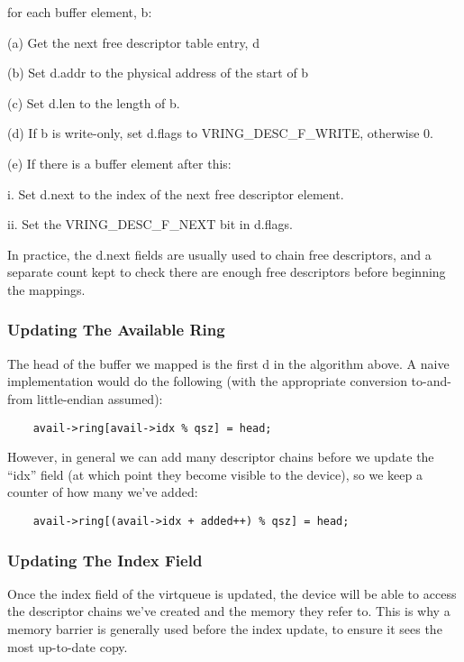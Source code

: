 for each buffer element, b:

  (a) Get the next free descriptor table entry, d

  (b) Set d.addr to the physical address of the start of b

  (c) Set d.len to the length of b.

  (d) If b is write-only, set d.flags to VRING_DESC_F_WRITE,
    otherwise 0.

  (e) If there is a buffer element after this:

    i. Set d.next to the index of the next free descriptor
      element.

    ii. Set the VRING_DESC_F_NEXT bit in d.flags.

In practice, the d.next fields are usually used to chain free
descriptors, and a separate count kept to check there are enough
free descriptors before beginning the mappings.

\subsubsection{Updating The Available Ring}\label{sec:General Initialization And Device Operation / Device Operation / Supplying Buffers to The Device / Updating The Available Ring}

The head of the buffer we mapped is the first d in the algorithm
above. A naive implementation would do the following (with the
appropriate conversion to-and-from little-endian assumed):

\begin{lstlisting}
	avail->ring[avail->idx % qsz] = head;
\end{lstlisting}

However, in general we can add many descriptor chains before we update
the “idx” field (at which point they become visible to the
device), so we keep a counter of how many we've added:

\begin{lstlisting}
	avail->ring[(avail->idx + added++) % qsz] = head;
\end{lstlisting}

\subsubsection{Updating The Index Field}\label{sec:General Initialization And Device Operation / Device Operation / Supplying Buffers to The Device / Updating The Index Field}

Once the index field of the virtqueue is updated, the device will
be able to access the descriptor chains we've created and the
memory they refer to. This is why a memory barrier is generally
used before the index update, to ensure it sees the most up-to-date
copy.

